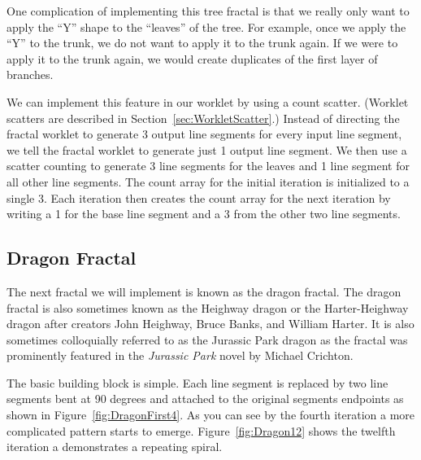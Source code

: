 One complication of implementing this tree fractal is that we really only want to apply the ``Y'' shape to the ``leaves'' of the tree.
For example, once we apply the ``Y'' to the trunk, we do not want to apply it to the trunk again.
If we were to apply it to the trunk again, we would create duplicates of the first layer of branches.

We can implement this feature in our worklet by using a count scatter.
(Worklet scatters are described in Section~\ref{sec:WorkletScatter}.)
Instead of directing the fractal worklet to generate 3 output line segments for every input line segment, we tell the fractal worklet to generate just 1 output line segment.
We then use a scatter counting to generate 3 line segments for the leaves and 1 line segment for all other line segments.
The count array for the initial iteration is initialized to a single 3.
Each iteration then creates the count array for the next iteration by writing a 1 for the base line segment and a 3 from the other two line segments.


\subsection{Dragon Fractal}
\label{sec:DragonFractal}


The next fractal we will implement is known as the dragon fractal.
The dragon fractal is also sometimes known as the Heighway dragon or the Harter-Heighway dragon after creators John Heighway, Bruce Banks, and William Harter.
It is also sometimes colloquially referred to as the Jurassic Park dragon as the fractal was prominently featured in the \textit{Jurassic Park} novel by Michael Crichton.

The basic building block is simple.
Each line segment is replaced by two line segments bent at 90 degrees and attached to the original segments endpoints as shown in Figure~\ref{fig:DragonFirst4}.
As you can see by the fourth iteration a more complicated pattern starts to emerge.
Figure~\ref{fig:Dragon12} shows the twelfth iteration a demonstrates a repeating spiral.

